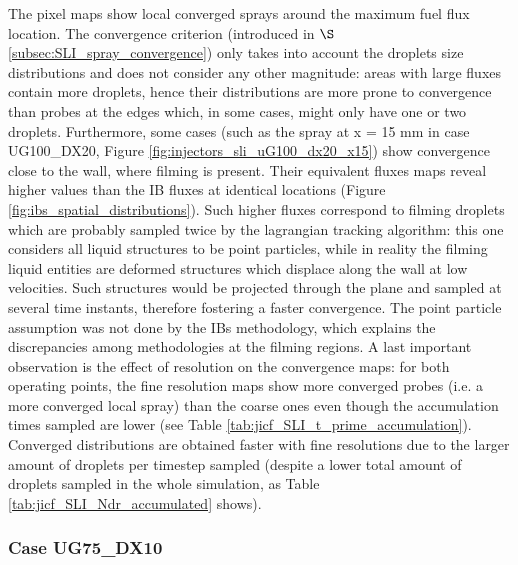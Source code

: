 The pixel maps show local converged sprays around the maximum fuel flux location. The convergence criterion (introduced in $\S$\ref{subsec:SLI_spray_convergence}) only takes into account the droplets size distributions and does not consider any other magnitude: areas with large fluxes contain more droplets, hence their distributions are more prone to convergence than probes at the edges which, in some cases, might only have one or two droplets. Furthermore, some cases (such as the spray at x = 15 mm in case UG100\_DX20, Figure \ref{fig:injectors_sli_uG100_dx20_x15}) show convergence close to the wall, where filming is present. Their equivalent fluxes maps reveal higher values than the IB fluxes at identical locations (Figure \ref{fig:ibs_spatial_distributions}). Such higher fluxes correspond to filming droplets which are probably sampled twice by the lagrangian tracking algorithm: this one considers all liquid structures to be point particles, while in reality the filming liquid entities are deformed structures which displace along the wall at low velocities. Such structures would be projected through the plane and sampled at several time instants, therefore fostering a faster convergence. The point particle assumption was not done by the IBs methodology, which explains the discrepancies among methodologies at the filming regions. A last important observation is the effect of resolution on the convergence maps: for both operating points, the fine resolution maps show more converged probes (i.e. a more converged local spray) than the coarse ones even though the accumulation times sampled are lower (see Table \ref{tab:jicf_SLI_t_prime_accumulation}). Converged distributions are obtained faster with fine resolutions due to the larger amount of droplets per timestep sampled (despite a lower total amount of droplets sampled in the whole simulation, as Table \ref{tab:jicf_SLI_Ndr_accumulated} shows). 

\clearpage


\subsubsection*{Case UG75\_DX10}





